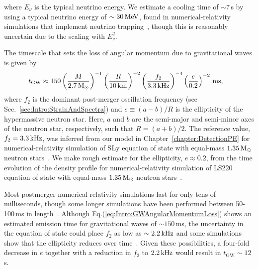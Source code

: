 \documentclass[../Thesis.tex]{subfiles}
\begin{document}
    where $E_\nu$ is the typical neutrino energy.
    We estimate a cooling time of $\sim 7$\,s by using a typical neutrino energy of $\sim 30\,\mathrm{MeV}$, found in numerical-relativity simulations that implement neutrino trapping~\cite{Sumiyoshi2020}, though this is reasonably uncertain due to the scaling with $E_\nu^2$.\par
    

    The timescale that sets the loss of angular momentum due to gravitational waves is given by~\cite{Paschalidis2012}
    \begin{align}
        t_{\mathrm{GW}} & \approx 150 \left(\frac{M}{2.7\,\mathrm{M}_{\odot}}\right)^{-1}\left(\frac{R}{10\,\mathrm{km}}\right)^{-2}\left(\frac{f_2}{3.3\,\mathrm{kHz}} \right)^{-4}\left(\frac{e}{0.2} \right)^{-2}\,\mathrm{ms}, \label{eq:Intro:GWAngularMomentumLoss}        
    \end{align}
    where $f_2$ is the dominant post-merger oscillation frequency (see Sec.~\ref{sec:Intro:StrainAndSpectra}) and $e\equiv(a-b)/R$ is the ellipticity of the hypermassive neutron star. 
    Here, $a$ and $b$ are the semi-major and semi-minor axes of the neutron star, respectively, such that $R=(a+b)/2$.
    The reference value, $f_2=3.3\,\mathrm{kHz}$, was inferred from our model in Chapter~\ref{chapter:DetectionPE} for numerical-relativity simulation of SLy equation of state with equal-mass $1.35\,\mathrm{M}_{\odot}$ neutron stars~\cite{Radice2016}.
    We make rough estimate for the ellipticity,  $e\approx0.2$, from the time evolution of the density profile for numerical-relativity simulation of LS220 equation of state with equal-mass $1.35\,\mathrm{M}_{\odot}$ neutron stars~\cite{Radice2017}.\par
 
    Most postmerger numerical-relativity simulations last for only tens of milliseconds, though some longer simulations have been performed between 50-100\,ms in length~\cite{Rezzolla2010,Ciolfi2017,Ciolfi2019,DePietri2020}.
    Although Eq.(\ref{eq:Intro:GWAngularMomentumLoss}) shows an estimated emission time for gravitational waves of $\sim 150\,$ms, the uncertainty in the equation of state could place $f_2$ as low as $\sim 2.2\,\mathrm{kHz}$ and some simulations show that the ellipticity reduces over time~\cite{Takami2015,Shibata2017a}.
    Given these possibilities, a four-fold decrease in $e$ together with a reduction in $f_2$ to $2.2\,\mathrm{kHz}$ would result in $t_{\mathrm{GW}} \sim 12\,$s.
\end{document}
